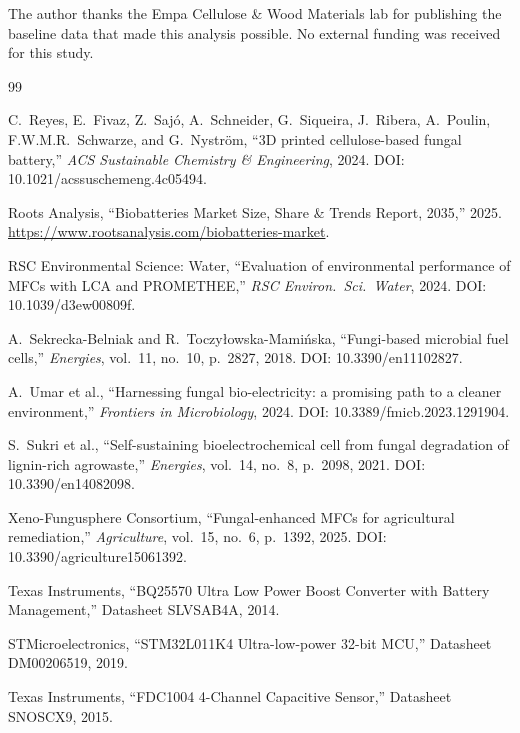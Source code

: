 \documentclass[twocolumn,10pt,a4paper]{article}
\begin{document}
The author thanks the Empa Cellulose \& Wood Materials lab for publishing the
baseline data that made this analysis possible. No external funding was
received for this study.

\begin{thebibliography}{99}

C.~Reyes, E.~Fivaz, Z.~Saj\'o, A.~Schneider, G.~Siqueira, J.~Ribera,
A.~Poulin, F.W.M.R.~Schwarze, and G.~Nystr\"om,
``3D printed cellulose-based fungal battery,''
\textit{ACS Sustainable Chemistry \& Engineering}, 2024.
DOI: 10.1021/acssuschemeng.4c05494.

Roots Analysis, ``Biobatteries Market Size, Share \& Trends Report, 2035,''
2025. \url{https://www.rootsanalysis.com/biobatteries-market}.

RSC Environmental Science: Water, ``Evaluation of environmental performance
of MFCs with LCA and PROMETHEE,''
\textit{RSC Environ.\ Sci.\ Water}, 2024.
DOI: 10.1039/d3ew00809f.

A.~Sekrecka-Belniak and R.~Toczy\l{}owska-Mami\'nska,
``Fungi-based microbial fuel cells,''
\textit{Energies}, vol.~11, no.~10, p.~2827, 2018.
DOI: 10.3390/en11102827.

A.~Umar et al.,
``Harnessing fungal bio-electricity: a promising path to a cleaner
environment,''
\textit{Frontiers in Microbiology}, 2024.
DOI: 10.3389/fmicb.2023.1291904.

S.~Sukri et al.,
``Self-sustaining bioelectrochemical cell from fungal degradation of
lignin-rich agrowaste,''
\textit{Energies}, vol.~14, no.~8, p.~2098, 2021.
DOI: 10.3390/en14082098.

Xeno-Fungusphere Consortium,
``Fungal-enhanced MFCs for agricultural remediation,''
\textit{Agriculture}, vol.~15, no.~6, p.~1392, 2025.
DOI: 10.3390/agriculture15061392.

Texas Instruments, ``BQ25570 Ultra Low Power Boost Converter with
Battery Management,'' Datasheet SLVSAB4A, 2014.

STMicroelectronics, ``STM32L011K4 Ultra-low-power 32-bit MCU,''
Datasheet DM00206519, 2019.

Texas Instruments, ``FDC1004 4-Channel Capacitive Sensor,''
Datasheet SNOSCX9, 2015.

\end{thebibliography}
\end{document}
